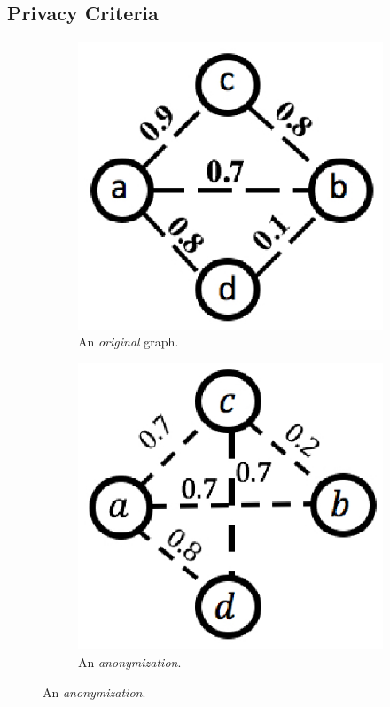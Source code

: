 {%
\subsection{Privacy Criteria}
\begin{figure}[!t]
    \centering
    \begin{subfigure}[t]{0.4\textwidth}
        \centering
        \includegraphics[scale=0.6]{figures/DegreeAUG/trueGraph.eps}
        \caption{\small{An \emph{original} graph.}}
         \label{fig:trueGraph}
    \end{subfigure}
    \begin{subfigure}[t]{0.4\textwidth}
        \centering
        \includegraphics[scale=0.6]{figures/DegreeAUG/anGraph.eps}
        \caption{\small{An \emph{anonymization}.}}
        \label{fig:anGraph}

\end{subfigure}
\end{figure}}

